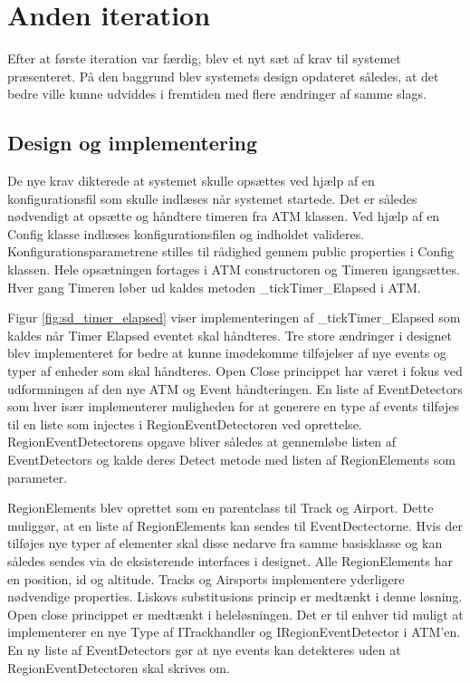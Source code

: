 \thispagestyle{fancy}
\chapter{Anden iteration}
\label{chp:seconditteration}
Efter at første iteration var færdig, blev et nyt sæt af krav til systemet præsenteret. På den baggrund blev systemets design opdateret således, at det bedre ville kunne udviddes i fremtiden med flere ændringer af samme slags. 

\section{Design og implementering}
De nye krav dikterede at systemet skulle opsættes ved hjælp af en konfigurationsfil som skulle indlæses når systemet startede. Det er således nødvendigt at opsætte og håndtere timeren fra ATM klassen. Ved hjælp af en Config klasse indlæses konfigurationsfilen og indholdet valideres. Konfigurationsparametrene stilles til rådighed gennem public properties i Config klassen. Hele opsætningen fortages i ATM constructoren og Timeren igangsættes. Hver gang Timeren løber ud kaldes metoden \_tickTimer\_Elapsed i ATM. 


Figur \ref{fig:sd_timer_elapsed} viser implementeringen af \_tickTimer\_Elapsed som kaldes når Timer Elapsed eventet skal håndteres. Tre store ændringer i designet blev implementeret for bedre at kunne imødekomme tilføjelser af nye events og typer af enheder som skal håndteres. Open Close princippet har været i fokus ved udformningen af den nye ATM og Event håndteringen.
En liste af EventDetectors som hver især implementerer muligheden for at generere en type af events tilføjes til en liste som injectes i RegionEventDetectoren ved oprettelse. RegionEventDetectorens opgave bliver således at gennemløbe listen af EventDetectors og kalde deres Detect metode med listen af RegionElements som parameter.

RegionElements blev oprettet som en parentclass til Track og Airport. Dette muliggør, at en liste af RegionElements kan sendes til EventDectectorne. Hvis der tilføjes nye typer af elementer skal disse nedarve fra samme basisklasse og kan således sendes via de eksisterende interfaces i designet. Alle RegionElements har en position, id og altitude. Tracks og Airsports implementere yderligere nødvendige properties. Liskovs substitusions princip er medtænkt i denne løsning.
Open close princippet er medtænkt i heleløsningen. Det er til enhver tid muligt at implementerer en nye Type af ITrackhandler og IRegionEventDetector i ATM'en. En ny liste af EventDetectors gør at nye events kan detekteres uden at RegionEventDetectoren skal skrives om.

